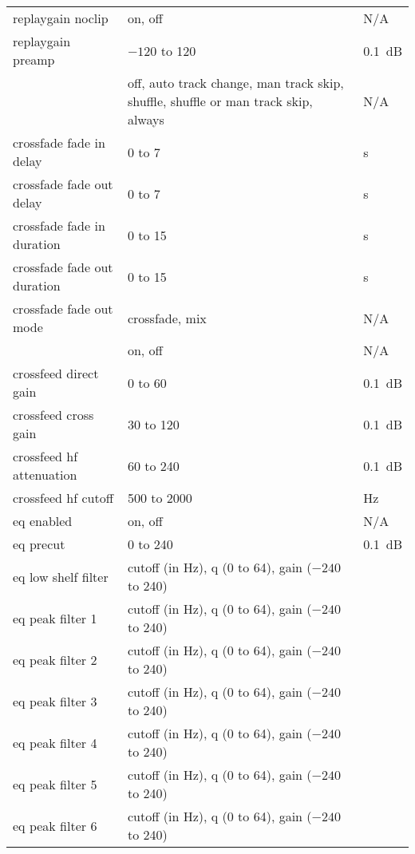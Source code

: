 \begin{center}
\begin{longtable}{>{\raggedright}p{}>{\raggedright}p{}p{}}
      replaygain noclip
                    & on, off           & N/A\\
      replaygain preamp
                    & $-120$ to 120     & 0.1~dB\\
%
      \opt{crossfade}{
      crossfade     & off, auto track change, man track skip, shuffle,
                    shuffle or man track skip, always
                                        & N/A\\
      crossfade fade in delay
                    & 0 to 7            & s\\
      crossfade fade out delay
                    & 0 to 7            & s\\
      crossfade fade in duration
                    & 0 to 15           & s\\
      crossfade fade out duration
                    & 0 to 15           & s\\
      crossfade fade out mode
                    & crossfade, mix    & N/A\\
      }
%
      crossfeed     & on, off           & N/A\\
      crossfeed direct gain
                    & 0 to 60           & 0.1~dB\\
      crossfeed cross gain
                    & 30 to 120         & 0.1~dB\\
      crossfeed hf attenuation
                    & 60 to 240         & 0.1~dB\\
      crossfeed hf cutoff
                    & 500 to 2000       & Hz\\
%
      eq enabled    & on, off           & N/A\\
      eq precut     & 0 to 240          & 0.1~dB\\
      eq low shelf filter & cutoff (in Hz), q (0 to 64), gain ($-240$ to 240)\\
      eq peak filter 1 & cutoff (in Hz), q (0 to 64), gain ($-240$ to 240)\\
      eq peak filter 2 & cutoff (in Hz), q (0 to 64), gain ($-240$ to 240)\\
      eq peak filter 3 & cutoff (in Hz), q (0 to 64), gain ($-240$ to 240)\\
      eq peak filter 4 & cutoff (in Hz), q (0 to 64), gain ($-240$ to 240)\\
      eq peak filter 5 & cutoff (in Hz), q (0 to 64), gain ($-240$ to 240)\\
      eq peak filter 6 & cutoff (in Hz), q (0 to 64), gain ($-240$ to 240)\\

\end{longtable}
\end{center}

